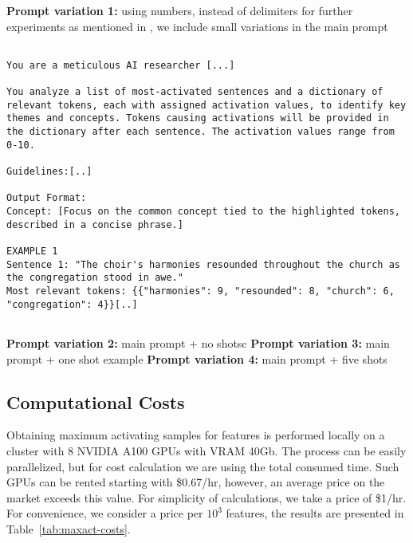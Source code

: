 \textbf{Prompt variation 1: }using numbers, instead of delimiters for further experiments as mentioned in , we include small variations in the main prompt

\begin{lstlisting}

You are a meticulous AI researcher [...]
 
You analyze a list of most-activated sentences and a dictionary of relevant tokens, each with assigned activation values, to identify key themes and concepts. Tokens causing activations will be provided in the dictionary after each sentence. The activation values range from 0-10.
          
Guidelines:[..]
          
Output Format:
Concept: [Focus on the common concept tied to the highlighted tokens, described in a concise phrase.]
          
EXAMPLE 1
Sentence 1: "The choir's harmonies resounded throughout the church as the congregation stood in awe."
Most relevant tokens: {{"harmonies": 9, "resounded": 8, "church": 6, "congregation": 4}}[..]


\end{lstlisting}
\textbf{Prompt variation 2:} main prompt + no shotsc\newline
\textbf{Prompt variation 3:} main prompt + one shot example \newline
\textbf{Prompt variation 4:} main prompt + five shots \newline

\subsection{Computational Costs}
\label{appendix-autointerpretability-costs}

Obtaining maximum activating samples for features is performed locally on a cluster with 8 NVIDIA A100 GPUs with VRAM 40Gb. The process can be easily parallelized, but for cost calculation we are using the total consumed time. Such GPUs can be rented starting with \$0.67/hr, however, an average price on the market exceeds this value. For simplicity of calculations, we take a price of \$1/hr. For convenience, we consider a price per $10^3$ features, the results are presented in Table~\ref{tab:maxact-costs}. 

